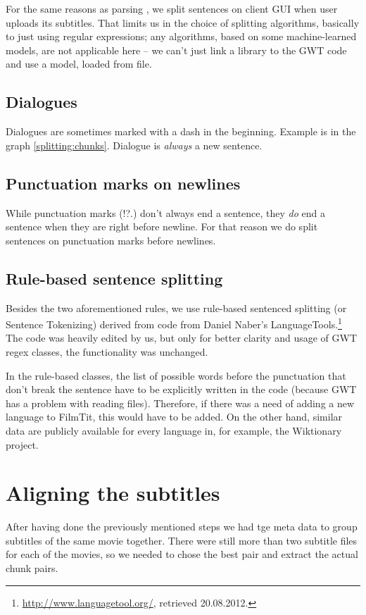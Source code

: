 For the same reasons as parsing , we split sentences on client GUI when user uploads its subtitles. That limits us in the choice of splitting algorithms, basically to just using regular expressions; any algorithms, based on some machine-learned models, are not applicable here -- we can't just link a library to the GWT code and use a model, loaded from file.

\subsection*{Dialogues}
Dialogues are sometimes marked with a dash in the beginning. Example is in the graph \ref{splitting:chunks}. Dialogue is \emph{always} a new sentence.

\subsection*{Punctuation marks on newlines}
While punctuation marks (!?.) don't always end a sentence, they \emph{do} end a sentence when they are right before newline. For that reason we do split sentences on punctuation marks before newlines.

\subsection*{Rule-based sentence splitting}
Besides the two aforementioned rules, we use rule-based sentenced splitting (or Sentence Tokenizing) derived from code from Daniel Naber's LanguageTools.\footnote{\url{http://www.languagetool.org/}, retrieved 20.08.2012.} The code was heavily edited by us, but only for better clarity and usage of GWT regex classes, the functionality was unchanged.

In the rule-based classes, the list of possible words before the punctuation that don't break the sentence have to be explicitly written in the code (because GWT has a problem with reading files). Therefore, if there was a need of adding a new language to FilmTit, this would have to be added. On the other hand, similar data are publicly available for every language in, for example, the Wiktionary project.

\section{Aligning the subtitles}
\label{sec:aligning_subtitles}

After having done the previously mentioned steps we had tge meta data to group subtitles of the same movie together. There were still more than two subtitle files for each of the movies, so we needed to chose the best pair and extract the actual chunk pairs.

